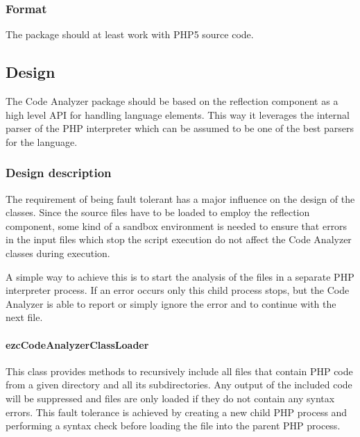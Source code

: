 \documentclass[10pt,final,a4paper,oneside]{article}
\begin{document}
\subsubsection{Format}
The package should at least work with PHP5 source code.


\subsection{Design}\label{subsec:CodeAnalyzerDesign}
%
%

The Code Analyzer package should be based on the reflection component
as a high level API for handling language elements.
This way it leverages the internal parser of the PHP interpreter
which can be assumed to be one of the best parsers for the language.

\subsubsection{Design description}
The requirement of being fault tolerant has a major influence
on the design of the classes.
Since the source files have to be loaded
to employ the reflection component, some kind
of a sandbox environment is needed to ensure that errors
in the input files which stop the script execution
do not affect the Code Analyzer classes during execution.

A simple way to achieve this is to start the analysis of the files
in a separate PHP interpreter process.
If an error occurs only this child process stops,
but the Code Analyzer is able to report or simply ignore the error
and to continue with the next file.


\paragraph{ezcCodeAnalyzerClassLoader}
This class provides methods to recursively include
all files that contain PHP code from a given directory and all its subdirectories.
Any output of the included code will be suppressed
and files are only loaded if they do not contain
any syntax errors.
This fault tolerance is achieved by creating a new child PHP process
and performing a syntax check before loading the file into the parent PHP process.

\end{document}
